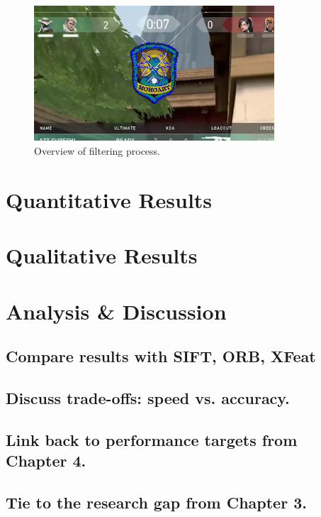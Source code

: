 \begin{figure}[H]
    \centering
    \includegraphics[width=0.8\textwidth]{ressources/image1_keypoints_masked.jpg}
    \caption{Overview of filtering process.}
    \label{fig:teacher_student}
\end{figure}
\section{Quantitative Results}
\section{Qualitative Results}
\section{Analysis \& Discussion}
\subsection{Compare results with SIFT, ORB, XFeat}
\subsection{Discuss trade-offs: speed vs. accuracy.}
\subsection{Link back to performance targets from Chapter 4.}
\subsection{Tie to the research gap from Chapter 3.}
